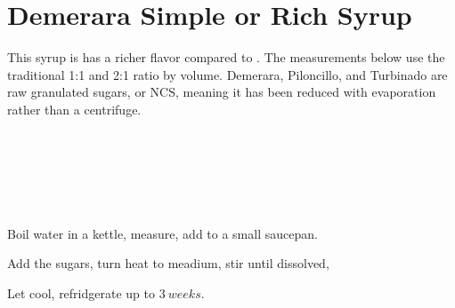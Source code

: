 \section[Demerara Syrup]{Demerara Simple or Rich Syrup}

\begin{recipestats}[
        servings=$1~C$,
        preptime=5~\minute,
        source=Mike \& Jane,
        original=\citefield{cocktailSeminars2021}{title}~\cite{cocktailSeminars2021},
    ]
\end{recipestats}

\begin{recipeabstract}
    This syrup is has a richer flavor compared to .
    The measurements below use the traditional 1:1 and 2:1 ratio by volume.
    Demerara, Piloncillo, and Turbinado are raw granulated sugars, or \gls{NCS},
    meaning it has been reduced with evaporation rather than a
    centrifuge\cite{worldSugarGuide}.
\end{recipeabstract}

\begin{ingredientcolumns}
    \begin{ingredientblock}[simple]
        \\
        \\
    \end{ingredientblock}

    \begin{ingredientblock}[rich]
        \\
        \\
    \end{ingredientblock}
\end{ingredientcolumns}

\smallskip
\begin{preparation}
\item Boil water in a kettle, measure, add to a small saucepan.
\item Add the sugars, turn heat to meadium, stir until dissolved,
\item Let cool, refridgerate up to $3~weeks$.
\end{preparation}

\recipeend%
